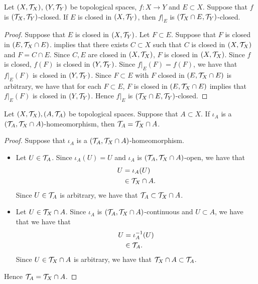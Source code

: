 \documentclass{book}
\begin{document}
\begin{ex} 
	Let $(X, \mathcal{T}_X)$, $(Y, \mathcal{T}_Y)$ be topological spaces, $f:X \rightarrow Y$ and $E \subset X$. Suppose that $f$ is $(\mathcal{T}_X, \mathcal{T}_Y)$-closed. If $E$ is closed in $(X, \mathcal{T}_Y)$, then $f|_E$ is $(\mathcal{T}_X \cap E, \mathcal{T}_Y)$-closed.
\end{ex}

\begin{proof}
	Suppose that $E$ is closed in $(X, \mathcal{T}_Y)$. Let $F \subset E$. Suppose that $F$ is closed in $(E, \mathcal{T}_X \cap E)$.  implies that there exists $C \subset X$ such that $C$ is closed in $(X, \mathcal{T}_X)$ and $F = C \cap E$. Since $C, E$ are closed in $(X, \mathcal{T}_X)$, $F$ is closed in $(X, \mathcal{T}_X)$. Since $f$ is closed, $f(F)$ is closed in $(Y, \mathcal{T}_Y)$. Since $f|_E(F) = f(F)$, we have that $f|_E(F)$ is closed in $(Y, \mathcal{T}_Y)$. Since $F \subset E$ with $F$ closed in $(E, \mathcal{T}_X \cap E)$ is arbitrary, we have that for each $F \subset E$, $F$ is closed in $(E, \mathcal{T}_X \cap E)$ implies that $f|_E(F)$ is closed in $(Y, \mathcal{T}_Y)$. Hence $f|_E$ is $(\mathcal{T}_X \cap E, \mathcal{T}_Y)$-closed.
\end{proof}

\begin{ex} 
	Let $(X, \mathcal{T}_X), (A, \mathcal{T}_A)$ be topological spaces. Suppose that $A \subset X$. If $\iota_A$ is a $(\mathcal{T}_A, \mathcal{T}_X \cap A)$-homeomorphism, then $\mathcal{T}_A = \mathcal{T}_X \cap A$. 
\end{ex}

\begin{proof} Suppose that $\iota_A$ is a $(\mathcal{T}_A, \mathcal{T}_X \cap A)$-homeomorphism.
	\begin{itemize}
		\item Let $U \in \mathcal{T}_A$. Since $\iota_A(U) = U$ and $\iota_A$ is $(\mathcal{T}_A, \mathcal{T}_X \cap A)$-open, we have that 
		\begin{align*}
			U 
			& = \iota_A(U) \\
			& \in \mathcal{T}_X \cap A.
		\end{align*}
		Since $U \in \mathcal{T}_A$ is arbitrary, we have that $\mathcal{T}_A \subset \mathcal{T}_X \cap A$.  
		\item Let $U \in \mathcal{T}_X \cap A$. Since $\iota_A$ is $(\mathcal{T}_A, \mathcal{T}_X \cap A)$-continuous and $U \subset A$, we have that we have that 
		\begin{align*}
			U
			& = \iota_A^{-1}(U) \\
			& \in \mathcal{T}_A.
		\end{align*}
		Since $U \in \mathcal{T}_X \cap A$ is arbitrary, we have that  $\mathcal{T}_X \cap A \subset \mathcal{T}_A$. 
	\end{itemize}
	Hence $\mathcal{T}_A = \mathcal{T}_X \cap A$. 
\end{proof}
\end{document}
